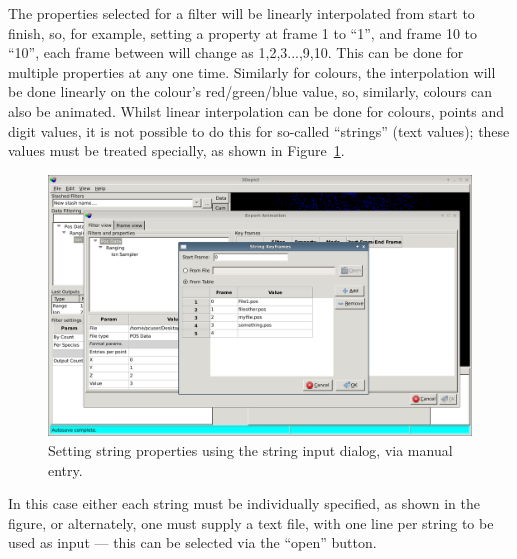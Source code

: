 \documentclass[10pt]{article}
\begin{document}
The properties selected for a filter will be linearly interpolated from start to finish, so, for example, setting a property at frame 1 to ``1'', and frame 10 to ``10'', each frame between will change as 1,2,3...,9,10. This can be done for multiple properties at any one time. Similarly for colours, the interpolation will be done linearly on the colour's red/green/blue value, so, similarly, colours can also be animated. Whilst linear interpolation can be done for colours, points and digit values, it is not possible to do this for so-called ``strings'' (text values); these values must be treated specially, as shown in Figure~\ref{fig:animatePropString}.


\begin{figure}
 \begin{center}
 \includegraphics[width=0.9 \textwidth,keepaspectratio=true]{./figures/exportanimDialogPropString.png}
 \caption{Setting string properties using the string input dialog, via manual entry.}
\label{fig:animatePropString}
\centering
\end{center}
\end{figure}




In this case either each string must be individually specified, as shown in the figure, or alternately, one must supply a text file, with one line per string to be used as input --- this can be selected via the ``open'' button.
\end{document}
